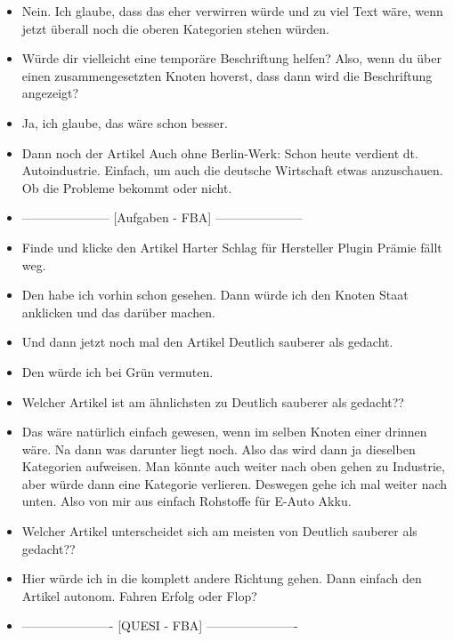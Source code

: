 {\begin{itemize}[]
        \item {} Nein. Ich glaube, dass das eher verwirren würde und zu viel Text wäre, wenn jetzt überall noch die oberen Kategorien stehen würden.
        \item {} Würde dir vielleicht eine temporäre Beschriftung helfen? Also, wenn du über einen zusammengesetzten Knoten hoverst, dass dann wird die Beschriftung angezeigt?
        \item {} Ja, ich glaube, das wäre schon besser.
        \item {} Dann noch der Artikel \flqq Auch ohne Berlin-Werk: Schon heute verdient dt. Autoindustrie\frqq{}.
              Einfach, um auch die deutsche Wirtschaft etwas anzuschauen.
              Ob die Probleme bekommt oder nicht.
        \item {---------------------} [Aufgaben - FBA] {---------------------}
        \item {} Finde und klicke den Artikel \flqq Harter Schlag für Hersteller Plugin Prämie fällt weg\frqq{}.
        \item {} Den habe ich vorhin schon gesehen.
              Dann würde ich den Knoten Staat anklicken und das darüber machen.
        \item {} Und dann jetzt noch mal den Artikel \flqq Deutlich sauberer als gedacht\frqq{}.
        \item {} Den würde ich bei Grün vermuten.
        \item {} Welcher Artikel ist am ähnlichsten zu \flqq Deutlich sauberer als gedacht?\frqq{}?
        \item {} Das wäre natürlich einfach gewesen, wenn im selben Knoten einer drinnen wäre.
              Na dann was darunter liegt noch. Also das wird dann ja dieselben Kategorien aufweisen.
              Man könnte auch weiter nach oben gehen zu Industrie, aber würde dann eine Kategorie verlieren.
              Deswegen gehe ich mal weiter nach unten.
              Also von mir aus einfach \flqq Rohstoffe für E-Auto Akku\frqq{}.
        \item {} Welcher Artikel unterscheidet sich am meisten von \flqq Deutlich sauberer als gedacht?\frqq{}?
        \item {} Hier würde ich in die komplett andere Richtung gehen.
              Dann einfach den Artikel \flqq autonom. Fahren Erfolg oder Flop?\frqq{}
        \item {----------------------} [QUESI - FBA] {----------------------}

\end{itemize}}
